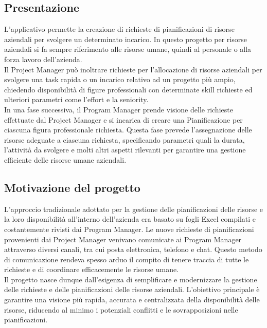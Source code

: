 \subsection{Presentazione}
L'applicativo permette la creazione di richieste di pianificazioni di risorse aziendali per svolgere un determinato incarico. In questo progetto per risorse aziendali si fa sempre riferimento alle risorse umane, quindi al personale o alla forza lavoro dell'azienda.\\
Il Project Manager può inoltrare richieste per l'allocazione di risorse aziendali per svolgere una task rapida o un incarico relativo ad un progetto più ampio, chiedendo disponibilità di figure professionali con determinate skill richieste ed ulteriori parametri come l'effort e la seniority.\\ 
In una fase successiva, il Program Manager prende visione delle richieste effettuate dal Project Manager e si incarica di creare una Pianificazione per ciascuna figura professionale richiesta. Questa fase prevede l'assegnazione delle risorse adeguate a ciascuna richiesta, specificando parametri quali la durata, l'attività da svolgere e molti altri aspetti rilevanti per garantire una gestione efficiente delle risorse umane aziendali.\\

\subsection{Motivazione del progetto}

L'approccio tradizionale adottato per la gestione delle pianificazioni delle risorse e la loro disponibilità all'interno dell'azienda era basato su fogli Excel compilati e costantemente rivisti dai Program Manager. Le nuove richieste di pianificazioni provenienti dai Project Manager venivano comunicate ai Program Manager attraverso diversi canali, tra cui posta elettronica, telefono e chat. Questo metodo di comunicazione rendeva spesso arduo il compito di tenere traccia di tutte le richieste e di coordinare efficacemente le risorse umane.\\
Il progetto nasce dunque dall’esigenza di semplificare e modernizzare la gestione delle richieste e delle pianificazioni delle risorse aziendali. L'obiettivo principale è garantire una visione più rapida, accurata e centralizzata della disponibilità delle risorse, riducendo al minimo i potenziali conflitti e le sovrapposizioni nelle pianificazioni.\\

